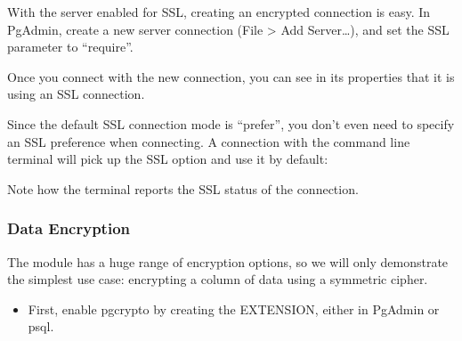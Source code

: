 \documentclass[a4paper,11pt,english]{sphinxmanual}
\begin{document}
With the server enabled for SSL, creating an encrypted connection is easy. In PgAdmin, create a new server connection (File \textgreater{} Add Server…), and set the SSL parameter to “require”.

\noindent{}

Once you connect with the new connection, you can see in its properties that it is using an SSL connection.

\noindent{}

Since the default SSL connection mode is “prefer”, you don’t even need to specify an SSL preference when connecting. A connection with the command line  terminal will pick up the SSL option and use it by default:

\begin{sphinxVerbatim}[commandchars=\\\{\}]
 
     
   

\end{sphinxVerbatim}

Note how the terminal reports the SSL status of the connection.


\subsubsection{Data Encryption}
\label{\detokenize{maintenance:data-encryption}}
The  module has a huge range of encryption options, so we will only demonstrate the simplest use case: encrypting a column of data using a symmetric cipher.
\begin{itemize}
\item {} 
First, enable pgcrypto by creating the EXTENSION, either in PgAdmin or psql.

\end{itemize}
\end{document}
